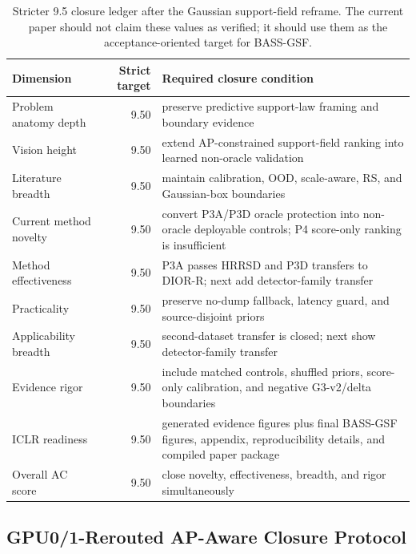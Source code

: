 \documentclass[10pt]{article}
\begin{document}
\begin{table}[h]
\centering
\small
\begin{tabular}{lrl}
\toprule
Dimension & Strict target & Required closure condition \\
\midrule
Problem anatomy depth & 9.50 & preserve predictive support-law framing and boundary evidence \\
Vision height & 9.50 & extend AP-constrained support-field ranking into learned non-oracle validation \\
Literature breadth & 9.50 & maintain calibration, OOD, scale-aware, RS, and Gaussian-box boundaries \\
Current method novelty & 9.50 & convert P3A/P3D oracle protection into non-oracle deployable controls; P4 score-only ranking is insufficient \\
Method effectiveness & 9.50 & P3A passes HRRSD and P3D transfers to DIOR-R; next add detector-family transfer \\
Practicality & 9.50 & preserve no-dump fallback, latency guard, and source-disjoint priors \\
Applicability breadth & 9.50 & second-dataset transfer is closed; next show detector-family transfer \\
Evidence rigor & 9.50 & include matched controls, shuffled priors, score-only calibration, and negative G3-v2/delta boundaries \\
ICLR readiness & 9.50 & generated evidence figures plus final BASS-GSF figures, appendix, reproducibility details, and compiled paper package \\
Overall AC score & 9.50 & close novelty, effectiveness, breadth, and rigor simultaneously \\
\bottomrule
\end{tabular}
\caption{Stricter 9.5 closure ledger after the Gaussian support-field reframe.
The current paper should not claim these values as verified; it should use them
as the acceptance-oriented target for BASS-GSF.}
\end{table}

\subsection{GPU0/1-Rerouted AP-Aware Closure Protocol}
\end{document}
